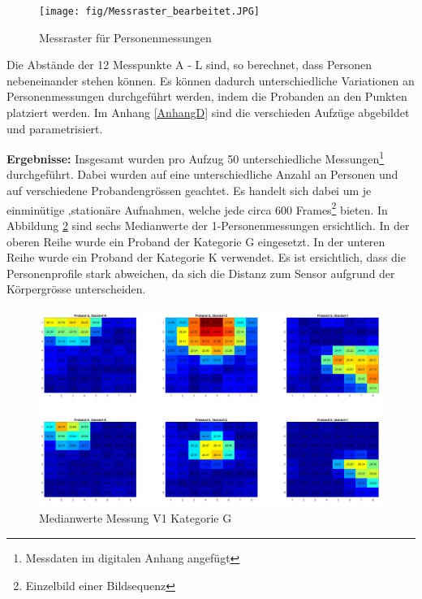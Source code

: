 \begin{figure}[H]
	\centering
	\texttt{[image: fig/Messraster\_bearbeitet.JPG]}
	\caption[Messraster für Personenmessungen]{Messraster für Personenmessungen}
	\label{fig:Messraster}
\end{figure}

Die Abstände der 12 Messpunkte A - L sind, so berechnet, dass Personen nebeneinander stehen können. Es können dadurch unterschiedliche Variationen an Personenmessungen durchgeführt werden, indem die Probanden an den Punkten platziert werden. Im Anhang \ref{AnhangD} sind die verschieden Aufzüge abgebildet und parametrisiert.

\newpage

\textbf{Ergebnisse:} Insgesamt wurden pro Aufzug 50 unterschiedliche Messungen\footnote[21]{Messdaten im digitalen Anhang angefügt} durchgeführt. Dabei wurden auf eine unterschiedliche Anzahl an Personen und auf verschiedene Probandengrössen geachtet. Es handelt sich dabei um je einminütige ,stationäre Aufnahmen, welche jede circa 600 Frames\footnote[22]{Einzelbild einer Bildsequenz} bieten. In Abbildung \ref{fig:p1gallpositionsmean} sind sechs Medianwerte der 1-Personenmessungen ersichtlich. In der oberen Reihe wurde ein Proband der Kategorie G eingesetzt. In der unteren Reihe wurde ein Proband der Kategorie K verwendet. Es ist ersichtlich, dass die Personenprofile stark abweichen, da sich die Distanz zum Sensor aufgrund der Körpergrösse unterscheiden.

\begin{figure}[H]
	\centering
	\includegraphics[width=1.0\textwidth]{fig/p1_k_g_aei.jpg}
	\caption[Medianwerte Messung V1 Kategorie G]{Medianwerte Messung V1 Kategorie G}
	\label{fig:p1gallpositionsmean}
\end{figure}

